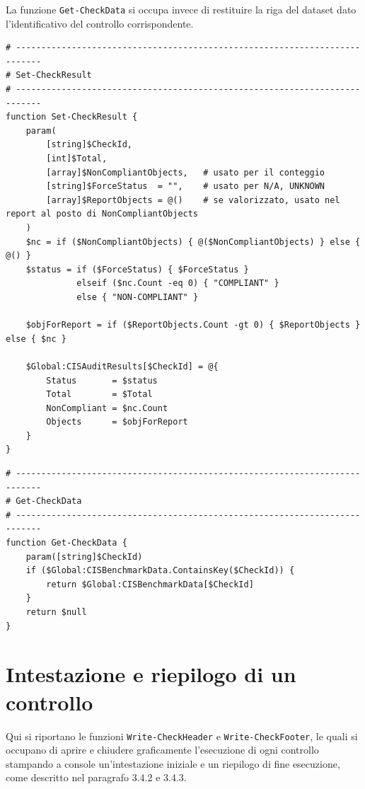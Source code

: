 \documentclass[a4paper,11pt]{report}
\begin{document}
La funzione \texttt{Get-CheckData} si occupa invece di restituire la riga del dataset dato l'identificativo del controllo corrispondente.

\begin{lstlisting}[style=azcli, caption={Funzione \texttt{Set-CheckResult} per la registrazione dell'esito di un controllo}, label={lst:set-check-result}]
# ---------------------------------------------------------------------------
# Set-CheckResult
# ---------------------------------------------------------------------------
function Set-CheckResult {
    param(
        [string]$CheckId,
        [int]$Total,
        [array]$NonCompliantObjects,   # usato per il conteggio
        [string]$ForceStatus  = "",    # usato per N/A, UNKNOWN
        [array]$ReportObjects = @()    # se valorizzato, usato nel report al posto di NonCompliantObjects
    )
    $nc = if ($NonCompliantObjects) { @($NonCompliantObjects) } else { @() }
    $status = if ($ForceStatus) { $ForceStatus }
              elseif ($nc.Count -eq 0) { "COMPLIANT" }
              else { "NON-COMPLIANT" }

    $objForReport = if ($ReportObjects.Count -gt 0) { $ReportObjects } else { $nc }

    $Global:CISAuditResults[$CheckId] = @{
        Status       = $status
        Total        = $Total
        NonCompliant = $nc.Count
        Objects      = $objForReport
    }
}
\end{lstlisting}

\begin{lstlisting}[style=azcli, caption={Funzione \texttt{Get-CheckData} per la lettura di una riga del dataset}, label={lst:get-check-data}]
# ---------------------------------------------------------------------------
# Get-CheckData 
# ---------------------------------------------------------------------------
function Get-CheckData {
    param([string]$CheckId)
    if ($Global:CISBenchmarkData.ContainsKey($CheckId)) {
        return $Global:CISBenchmarkData[$CheckId]
    }
    return $null
}
\end{lstlisting}

\section{Intestazione e riepilogo di un controllo}
\label{app:output}

Qui si riportano le funzioni \texttt{Write-CheckHeader} e \texttt{Write-CheckFooter}, le quali si occupano di aprire e chiudere graficamente l'esecuzione di ogni controllo stampando a console un'intestazione iniziale e un riepilogo di fine esecuzione, come descritto nel paragrafo 3.4.2 e 3.4.3.
\end{document}
